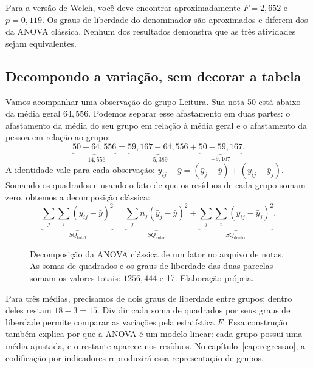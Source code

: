 Para a versão de Welch, você deve encontrar aproximadamente $F=2{,}652$ e $p=0{,}119$. Os graus de liberdade do denominador são aproximados e diferem dos da ANOVA clássica. Nenhum dos resultados demonstra que as três atividades sejam equivalentes.

\subsection{Decompondo a variação, sem decorar a tabela}

Vamos acompanhar uma observação do grupo Leitura. Sua nota 50 está abaixo da média geral $64{,}556$. Podemos separar esse afastamento em duas partes: o afastamento da média do seu grupo em relação à média geral e o afastamento da pessoa em relação ao grupo:
\[
\underbrace{50-64{,}556}_{-14{,}556}
=\underbrace{59{,}167-64{,}556}_{-5{,}389}
+\underbrace{50-59{,}167}_{-9{,}167}.
\]
A identidade vale para cada observação: $y_{ij}-\bar y=(\bar y_j-\bar y)+(y_{ij}-\bar y_j)$. Somando os quadrados e usando o fato de que os resíduos de cada grupo somam zero, obtemos a decomposição clássica:
\[
\underbrace{\sum_j\sum_i(y_{ij}-\bar y)^2}_{SQ_{\mathrm{total}}}
=\underbrace{\sum_jn_j(\bar y_j-\bar y)^2}_{SQ_{\mathrm{entre}}}
+\underbrace{\sum_j\sum_i(y_{ij}-\bar y_j)^2}_{SQ_{\mathrm{dentro}}}.
\]

\begin{figure}[H]
\centering
{}
\caption{Decomposição da ANOVA clássica de um fator no arquivo de notas. As somas de quadrados e os graus de liberdade das duas parcelas somam os valores totais: $1256{,}444$ e 17. Elaboração própria.}
\label{fig:decomposicao-anova}
\end{figure}

Para três médias, precisamos de dois graus de liberdade entre grupos; dentro deles restam $18-3=15$. Dividir cada soma de quadrados por seus graus de liberdade permite comparar as variações pela estatística $F$. Essa construção também explica por que a ANOVA é um modelo linear: cada grupo possui uma média ajustada, e o restante aparece nos resíduos. No capítulo~\ref{cap:regressao}, a codificação por indicadores reproduzirá essa representação de grupos.

